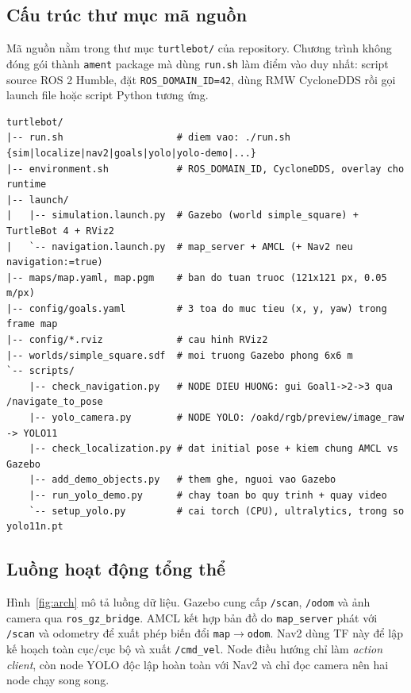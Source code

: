 \documentclass[a4paper,12pt]{article}
\newcommand{\rospkg}[1]{\texttt{#1}}
\begin{document}
\subsection{Cấu trúc thư mục mã nguồn}
Mã nguồn nằm trong thư mục \texttt{turtlebot/} của repository. Chương trình không đóng gói thành \rospkg{ament} package mà dùng \texttt{run.sh} làm điểm vào duy nhất: script source ROS 2 Humble, đặt \texttt{ROS\_DOMAIN\_ID=42}, dùng RMW CycloneDDS rồi gọi launch file hoặc script Python tương ứng.
\begin{lstlisting}[language={},numbers=none]
turtlebot/
|-- run.sh                    # diem vao: ./run.sh {sim|localize|nav2|goals|yolo|yolo-demo|...}
|-- environment.sh            # ROS_DOMAIN_ID, CycloneDDS, overlay cho runtime
|-- launch/
|   |-- simulation.launch.py  # Gazebo (world simple_square) + TurtleBot 4 + RViz2
|   `-- navigation.launch.py  # map_server + AMCL (+ Nav2 neu navigation:=true)
|-- maps/map.yaml, map.pgm    # ban do tuan truoc (121x121 px, 0.05 m/px)
|-- config/goals.yaml         # 3 toa do muc tieu (x, y, yaw) trong frame map
|-- config/*.rviz             # cau hinh RViz2
|-- worlds/simple_square.sdf  # moi truong Gazebo phong 6x6 m
`-- scripts/
    |-- check_navigation.py   # NODE DIEU HUONG: gui Goal1->2->3 qua /navigate_to_pose
    |-- yolo_camera.py        # NODE YOLO: /oakd/rgb/preview/image_raw -> YOLO11
    |-- check_localization.py # dat initial pose + kiem chung AMCL vs Gazebo
    |-- add_demo_objects.py   # them ghe, nguoi vao Gazebo
    |-- run_yolo_demo.py      # chay toan bo quy trinh + quay video
    `-- setup_yolo.py         # cai torch (CPU), ultralytics, trong so yolo11n.pt
\end{lstlisting}

\subsection{Luồng hoạt động tổng thể}
Hình~\ref{fig:arch} mô tả luồng dữ liệu. Gazebo cung cấp \texttt{/scan}, \texttt{/odom} và ảnh camera qua \texttt{ros\_gz\_bridge}. AMCL kết hợp bản đồ do \texttt{map\_server} phát với \texttt{/scan} và odometry để xuất phép biến đổi \texttt{map}$\to$\texttt{odom}. Nav2 dùng TF này để lập kế hoạch toàn cục/cục bộ và xuất \texttt{/cmd\_vel}. Node điều hướng chỉ làm \emph{action client}, còn node YOLO độc lập hoàn toàn với Nav2 và chỉ đọc camera nên hai node chạy song song.
\end{document}
